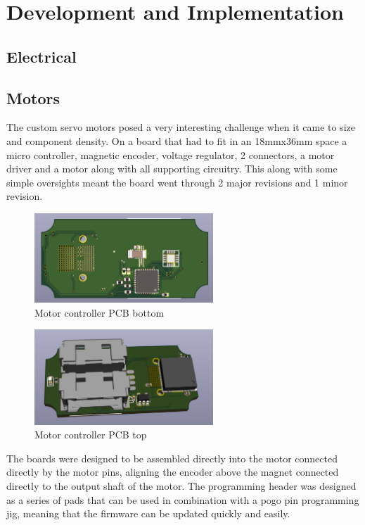 \section{Development and Implementation}
\subsection{Electrical}
\subsection{Motors}
The custom servo motors posed a very interesting challenge when it came to size and component density. On a board that had to fit in an 18mmx36mm space a micro controller, magnetic encoder, voltage regulator, 2 connectors, a motor driver and a motor along with all supporting circuitry. This along with some simple oversights meant the board went through 2 major revisions and 1 minor revision. 

\begin{figure}[H]
       \centering
       \includegraphics[width=0.6\textwidth]{figures/MotorControllerBottom.png}
       \caption{Motor controller PCB bottom}
       \label{fig:MotortControllerPCBBottom}
   \end{figure}
   \begin{figure}[H]
       \centering
       \includegraphics[width=0.6\textwidth]{figures/MotorControllerTop.png}
       \caption{Motor controller PCB top}
       \label{fig:MotorControllerPCBTop}
   \end{figure}
The boards were designed to be assembled directly into the motor connected directly by the motor pins, aligning the encoder above the magnet connected directly to the output shaft of the motor. The programming header was designed as a series of pads that can be used in combination with a pogo pin programming jig, meaning that the firmware can be updated quickly and easily. 
